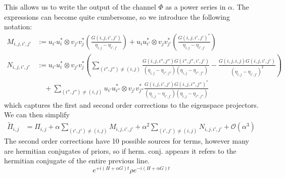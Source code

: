 \documentclass{article}
\newcommand{\parens}[1]{\left( #1 \right)}
\newcommand{\bigo}[1]{\mathcal{O}\left( #1 \right)}
\begin{document}
This allows us to write the output of the channel $\Phi$ as a power series in $\alpha$. The expressions can become quite cumbersome, so we introduce the following notation:
\begin{align}
    M_{i,j,i',j'} &:=  u_{i'} u_i^* \otimes v_{j'} v_j^* \parens{  \frac{G(i,j,i',j')}{\eta_{i,j} - \eta_{i',j'}} } +  u_i u_{i'}^* \otimes v_j v_{j'}^* \parens{  \frac{G(i,j,i',j')^*}{\eta_{i,j} - \eta_{i',j'}} } \\
    N_{i,j,i',j'} &:= u_{i'} u_i^* \otimes v_{j'} v_j^* \parens{ \sum_{(i'',j'') \neq (i,j)} \frac{G(i,j,i'',j'') G(i'',j'',i',j')}{(\eta_{i,j} - \eta_{i'',j''})(\eta_{i,j} - \eta_{i'',j''})} -  \frac{G(i,j,i,j) G(i,j,i',j')}{(\eta_{i,j} - \eta_{i',j'})^2}} \\
    & \quad + \sum_{(i'',j'') \neq (i,j)} u_{i'}u_{i''}^* \otimes v_{j'} v_{j''}^* \frac{G(i,j,i',j') G(i,j,i'',j'')^*}{(\eta_{i,j} - \eta_{i',j'})(\eta_{i,j} - \eta_{i'',j''})}
\end{align}
which captures the first and second order corrections to the eigenspace projectors. We can then simplify
\begin{align}
    \widetilde{\Pi}_{i,j} &= \Pi_{i,j} + \alpha \sum_{(i',j') \neq (i,j)} M_{i,j,i',j'} + \alpha^2 \sum_{(i',j') \neq (i,j)} N_{i,j,i',j'} + \bigo{\alpha^3}
\end{align}
The second order corrections have 10 possible sources for terms, however many are hermitian conjugates of priors, so if herm. conj. appears it refers to the hermitian conjugate of the entire previous line.
\newpage
\begin{equation}
    e^{+i(H + \alpha G)t} \rho e^{-i (H + \alpha G) t}
\end{equation}
\end{document}
